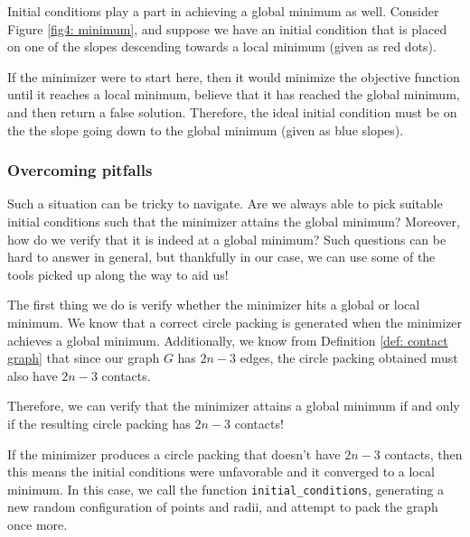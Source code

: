 \vspace{-4mm}
\begin{flushleft}
Initial conditions play a part in achieving a global minimum as well. Consider Figure \ref{fig4: minimum}, and suppose we have an initial condition that is placed on one of the slopes descending towards a local minimum (given as red dots). 
\end{flushleft}

\begin{flushleft}
If the minimizer were to start here, then it would minimize the objective function until it reaches a local minimum, believe that it has reached the global minimum, and then return a false solution. Therefore, the ideal initial condition must be on the the slope going down to the global minimum (given as blue slopes).
\end{flushleft}

\subsubsection{Overcoming pitfalls}

\begin{flushleft}
Such a situation can be tricky to navigate. Are we always able to pick suitable initial conditions such that the minimizer attains the global minimum? Moreover, how do we verify that it is indeed at a global minimum? Such questions can be hard to answer in general, but thankfully in our case, we can use some of the tools picked up along the way to aid us!
\end{flushleft}

\begin{flushleft}
The first thing we do is verify whether the minimizer hits a global or local minimum. We know that a correct circle packing is generated when the minimizer achieves a global minimum. Additionally, we know from Definition \ref{def: contact graph} that since our graph $G$ has $2n-3$ edges, the circle packing obtained must also have $2n-3$ contacts. 
\end{flushleft}

\begin{flushleft}
Therefore, we can verify that the minimizer attains a global minimum if and only if the resulting circle packing has $2n-3$ contacts! 
\end{flushleft}

\begin{flushleft}
If the minimizer produces a circle packing that doesn't have $2n-3$ contacts, then this means the initial conditions were unfavorable and it converged to a local minimum. In this case, we call the function \texttt{initial\_conditions}, generating a new random configuration of points and radii, and attempt to pack the graph once more. 
\end{flushleft}

